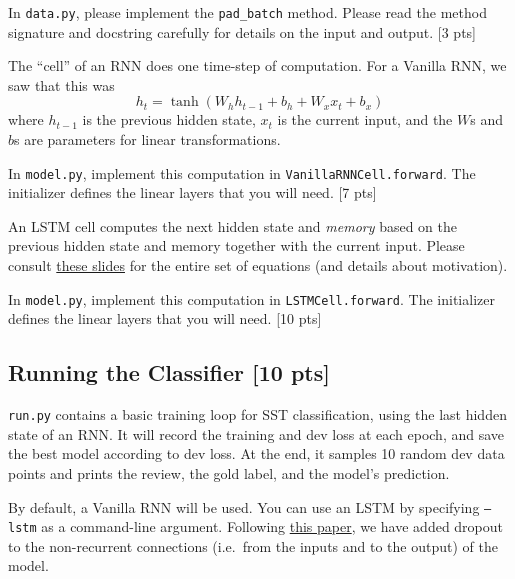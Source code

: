 \documentclass[11pt]{article}
\begin{document}
\noindent In \texttt{data.py}, please implement the \texttt{pad\_batch} method.  Please read the method signature and docstring carefully for details on the input and output. \hfill [3 pts]


\vspace{2em}
 The ``cell'' of an RNN does one time-step of computation.  For a Vanilla RNN, we saw that this was
\[ h_t = \tanh\left( W_h h_{t-1} + b_h + W_x x_t + b_x \right) \]
where $h_{t-1}$ is the previous hidden state, $x_t$ is the current input, and the $W$s and $b$s are parameters for linear transformations.

\noindent In \texttt{model.py}, implement this computation in \texttt{VanillaRNNCell.forward}.  The initializer defines the linear layers that you will need. \hfill [7 pts]


\vspace{2em}
 An LSTM cell computes the next hidden state and \emph{memory} based on the previous hidden state and memory together with the current input.  Please consult \href{https://www.shane.st/teaching/574/spr25/slides/8_lstm.pdf}{these slides} for the entire set of equations (and details about motivation).

\noindent In \texttt{model.py}, implement this computation in \texttt{LSTMCell.forward}.  The initializer defines the linear layers that you will need. \hfill [10 pts]



\subsection{Running the Classifier [10 pts]}

\texttt{run.py} contains a basic training loop for SST classification, using the last hidden state of an RNN. It will record the training and dev loss at each epoch, and save the best model according to dev loss.  At the end, it samples 10 random dev data points and prints the review, the gold label, and the model's prediction.

\vspace{2em}
 By default, a Vanilla RNN will be used.  You can use an LSTM by specifying \texttt{--lstm} as a command-line argument.  Following \href{https://arxiv.org/abs/1409.2329}{this paper}, we have added dropout to the non-recurrent connections (i.e.\ from the inputs and to the output) of the model.
\end{document}
